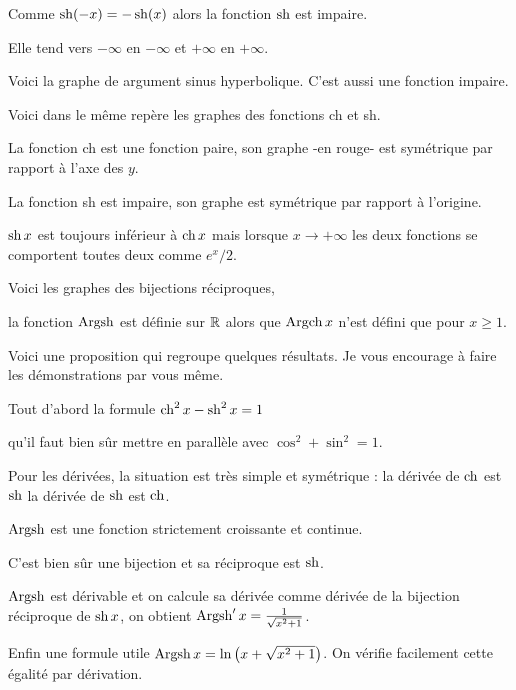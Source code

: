Comme $\mathop{\mathrm{sh}}\nolimits(-x)=-\mathop{\mathrm{sh}}\nolimits(x)$ alors
la fonction $\mathop{\mathrm{sh}}\nolimits$ est impaire.

Elle tend vers $-\infty$ en $-\infty$ et $+\infty$ en $+\infty$.

\change

Voici la graphe de argument sinus hyperbolique.
C'est aussi une fonction impaire.


\diapo

Voici dans le même repère les graphes des fonctions ch et sh.

La fonction ch est une fonction paire, son graphe -en rouge- 
est symétrique par rapport à l'axe des $y$.

La fonction sh est impaire, son graphe est symétrique par rapport à l'origine.

$\mathop{\mathrm{sh}}\nolimits x$ est toujours inférieur à $\mathop{\mathrm{ch}}\nolimits x$ mais lorsque $x \to +\infty$
les deux fonctions se comportent toutes deux comme $e^x/2$.


\change

Voici les graphes des bijections réciproques,

la fonction $\mathop{\mathrm{Argsh}}\nolimits$ est définie sur $\mathbb{R}$ alors
que $\mathop{\mathrm{Argch}}\nolimits x$ n'est défini que pour $x \ge 1$.


\diapo


Voici une proposition qui regroupe quelques résultats.
Je vous encourage à faire les démonstrations par vous même.


Tout d'abord la formule $\mathop{\mathrm{ch}}\nolimits^2 x - \mathop{\mathrm{sh}}\nolimits^2 x =1$

qu'il faut bien sûr mettre en parallèle avec $\cos^2 + \sin^2 =1$.



\change


Pour les dérivées, la situation est très simple et symétrique :
la dérivée de $\mathop{\mathrm{ch}}\nolimits$ est $\mathop{\mathrm{sh}}\nolimits$ la dérivée de $\mathop{\mathrm{sh}}\nolimits$ est $\mathop{\mathrm{ch}}\nolimits$.


\change 

 $\mathop{\mathrm{Argsh}}\nolimits$ est une fonction strictement croissante et continue.
 
 C'est bien sûr une bijection et sa réciproque est $\mathop{\mathrm{sh}}\nolimits$.
 
 \change
 
$\mathop{\mathrm{Argsh}}\nolimits$ est dérivable  et on calcule sa dérivée comme dérivée de la 
bijection réciproque de $\mathop{\mathrm{sh}}\nolimits x$, on obtient $\mathop{\mathrm{Argsh}}\nolimits'x=\frac{1}{\sqrt{x^2+1}}$.

\change


Enfin une formule utile $\mathop{\mathrm{Argsh}}\nolimits x = \ln\big(x+ \sqrt{x^2+1}\big)$.
On vérifie facilement cette égalité par dérivation.

